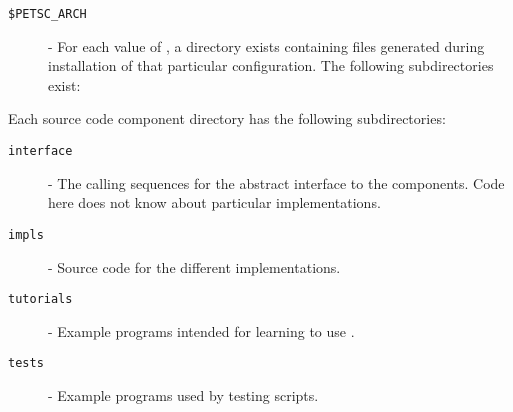 \begin{description}
\item[\texttt{\$PETSC\_ARCH}] - For each value of , a directory exists containing files generated during installation of that particular configuration. The following subdirectories exist:
\end{description}

Each \slepc source code component directory has the following subdirectories:
\begin{description}
\item[\texttt{interface}] - The calling sequences for the abstract interface to the components. Code here does not know about particular implementations.
\item[\texttt{impls}] - Source code for the different implementations.
\item[\texttt{tutorials}] - Example programs intended for learning to use \slepc.
\item[\texttt{tests}] - Example programs used by testing scripts.
\end{description}






